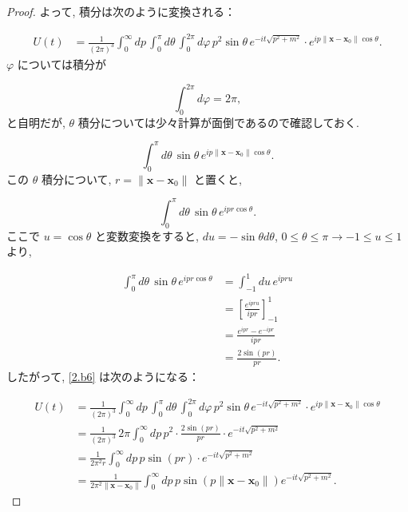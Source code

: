 \documentclass[a4paper,12pt]{article}
\begin{document}
\begin{proof}
\noindent よって, 積分は次のように変換される：

\begin{align*}\label{2.b6}
  U(t) &= \frac{1}{(2\pi)^3} \int_0^\infty dp \, \int_{0}^{\pi} d\theta \, \int_{0}^{2\pi} d\varphi \, p^2 \sin \theta \, e^{-it\sqrt{p^2 + m^2}} \cdot e^{i p \| \boldsymbol{x} - \boldsymbol{x}_0 \| \cos \theta}. \tag{2-1.b6}
\end{align*}
$\varphi$ については積分が

\begin{equation*}
  \int_{0}^{2\pi} d\varphi = 2\pi, \tag{2-1.b7}
\end{equation*} 
と自明だが, $\theta$ 積分については少々計算が面倒であるので確認しておく.

\begin{equation*}
  \int_{0}^{\pi} d\theta \, \sin \theta \, e^{i p \| \boldsymbol{x} - \boldsymbol{x}_0 \| \cos \theta}. \tag{2-1.b8}
\end{equation*}
この $\theta$ 積分について, $r = \| \boldsymbol{x} - \boldsymbol{x}_0 \|$ と置くと, 

\begin{equation*}
  \int_{0}^{\pi} d\theta \, \sin \theta \, e^{i p r \cos \theta}. \tag{2-1.b9}
\end{equation*}
ここで $u = \cos \theta$ と変数変換をすると, $du = -\sin \theta d\theta$, $0 \leq \theta \leq \pi \to -1 \leq u \leq 1$ より, 

\begin{align*}
  \int_{0}^{\pi} d\theta \, \sin \theta \, e^{i p r \cos \theta} &= \int_{-1}^{1} du \, e^{i p r u} \tag{2-1.b10}\\
  &= \left[\frac{e^{i p r u}}{i p r}\right]_{-1}^{1} \tag{2-1.b11} \\
  &= \frac{e^{i p r} - e^{-i p r}}{i p r} \tag{2-1.b12} \\
  &= \frac{2\sin(p r)}{p r}. \tag{2-1.b13}
\end{align*}
したがって, \eqref{2.b6} は次のようになる：

\begin{align*}
  U(t) &= \frac{1}{(2\pi)^3} \int_0^\infty dp \, \int_{0}^{\pi} d\theta \, \int_{0}^{2\pi} d\varphi \, p^2 \sin \theta \, e^{-it\sqrt{p^2 + m^2}} \cdot e^{i p \| \boldsymbol{x} - \boldsymbol{x}_0 \| \cos \theta} \tag{2-1.b14} \\
  &= \frac{1}{(2\pi)^3} \, 2\pi \int_0^\infty dp \, p^2 \cdot \frac{2\sin(p r)}{p r} \cdot e^{-it\sqrt{p^2 + m^2}} \tag{2-1.b15}\\
  &= \frac{1}{2\pi^2 r} \int_0^\infty dp \, p\sin(p r)\cdot e^{-it\sqrt{p^2 + m^2}} \tag{2-1.b16}\\
  &= \frac{1}{2\pi^2 \| \boldsymbol{x} - \boldsymbol{x}_0 \|} \int_0^\infty dp \, p \sin(p \| \boldsymbol{x} - \boldsymbol{x}_0 \|) e^{-it\sqrt{p^2 + m^2}}. \tag{2-1.b17}
\end{align*}


\end{proof}
\end{document}
